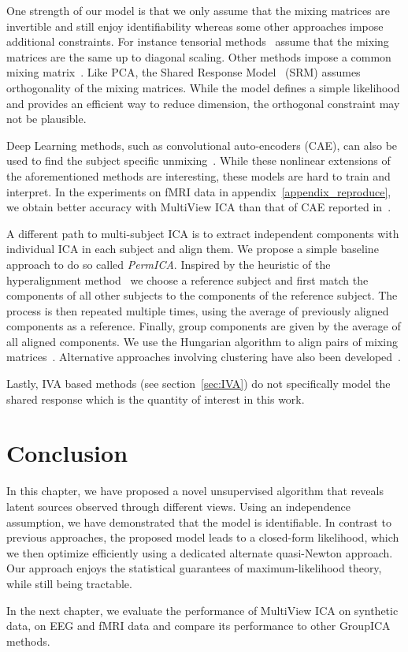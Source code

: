 One strength of our model is that we only assume that the mixing matrices are invertible and still enjoy identifiability whereas some other approaches impose additional constraints. For instance tensorial methods~\cite{beckmann2005tensorial} assume that the mixing matrices are the same up to diagonal scaling.
Other methods impose a common mixing matrix~\cite{cong2013validating, grin2010independent, calhoun2001fmri, Monti18UAI}. Like PCA, the Shared Response Model~\cite{chen2015reduced} (SRM) assumes orthogonality of the mixing matrices. While the model defines a simple likelihood and provides an efficient way to reduce dimension, the orthogonal constraint may not be plausible.

Deep Learning methods, such as convolutional auto-encoders (CAE), can also be used to find the subject specific unmixing~\cite{chen2016convolutional}. While these nonlinear extensions of the aforementioned methods are interesting, these models are hard to train and interpret. In the experiments on fMRI data in appendix~\ref{appendix_reproduce}, we obtain better accuracy with MultiView ICA than that of CAE reported in~\cite{chen2016convolutional}.

A different path to multi-subject ICA is to extract independent components with individual ICA in each subject and align them. We propose a simple baseline approach to do so called \emph{PermICA}.
Inspired by the heuristic of the hyperalignment method~\cite{haxby2011common} we choose a reference subject and first match the components of all other subjects to the components of the reference subject. The process is then repeated multiple times, using the average of previously aligned components as a reference. Finally, group components are given by the average of all aligned components. We use the Hungarian algorithm to align pairs of mixing matrices~\cite{tichavsky2004optimal}.
Alternative approaches involving clustering have also been developed~\cite{esposito2005independent,bigdely2013measure}.

Lastly, IVA based methods (see section~\ref{sec:IVA}) do not specifically model
the shared response which is the quantity of interest in this work.

\section{Conclusion}
In this chapter, we have proposed a novel unsupervised algorithm that reveals latent sources observed through different views. Using an independence assumption, 
we have demonstrated that the model is identifiable.
% 
In contrast to previous approaches, the proposed model leads to a closed-form likelihood, which we then optimize efficiently using a dedicated alternate quasi-Newton approach.
% 
Our approach enjoys the statistical guarantees of maximum-likelihood theory, while still being tractable.
% 

In the next chapter, we evaluate the performance of MultiView ICA on synthetic
data, on EEG and fMRI data and compare its performance to other GroupICA methods.
